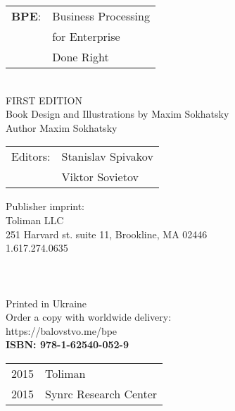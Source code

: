 \begingroup
{}
\parindent 0pt
\parskip
\baselineskip

\begin{tabular}{ll}
{\bf BPE}: & Business Processing \\
    & for Enterprise \\
    & Done Right \\
\end{tabular}
\\

FIRST EDITION \\

Book Design and Illustrations by Maxim Sokhatsky \\
Author Maxim Sokhatsky \\

\begin{tabular}{ll}
Editors: & Stanislav Spivakov \\
         & Viktor Sovietov \\
\end{tabular}

Publisher imprint: \\
Toliman LLC \\
251 Harvard st. suite 11, Brookline, MA 02446 \\
1.617.274.0635 \\
\\
\\
\\



Printed in Ukraine \\

Order a copy with worldwide delivery: \\
https://balovstvo.me/bpe \\

{\bf  ISBN: 978-1-62540-052-9\hspace{2em}}

\begin{tabular}{ll}
\textcopyright{} 2015 & Toliman \\
\textcopyright{} 2015 & Synrc Research Center
\end{tabular}

\endgroup

   \thispagestyle{empty}
